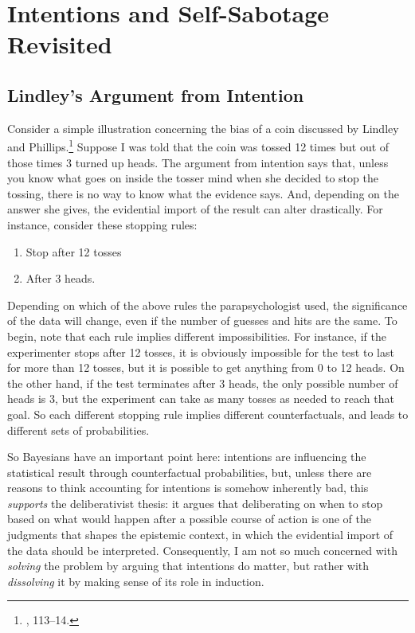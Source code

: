 \hypertarget{intentions-and-self-sabotage-redux}{%
\section{Intentions and Self-Sabotage
Revisited}\label{sec:intentions-and-self-sabotage-redux}}
\subsection{Lindley's Argument from Intention}
Consider a simple illustration concerning the bias of a coin discussed
by Lindley and Phillips.\footnote{\cite{lindleybern}, 113--14.} Suppose I was told
that the coin was tossed 12 times but out of those times 3 turned up
heads. The argument from intention says that, unless you know what goes
on inside the tosser mind when she decided to stop the tossing, there is
no way to know what the evidence says. And, depending on the answer she
gives, the evidential import of the result can alter drastically. For
instance, consider these stopping rules:

\begin{enumerate}
\def\labelenumi{\arabic{enumi}.}
\tightlist
\item
  Stop after 12 tosses
\item
  After 3 heads.
\end{enumerate}

Depending on which of the above rules the
parapsychologist used, the significance of the data will change, even if
the number of guesses and hits are the same. To begin, note that each
rule implies different impossibilities. For instance, if the
experimenter stops after 12 tosses, it is obviously impossible for the
test to last for more than 12 tosses, but it is possible to get anything from 0 to 12 heads. On the other hand, if
the test terminates after 3 heads, the only possible number of heads is
3, but the experiment can take as many tosses as needed to reach that
goal. So each different stopping rule implies different counterfactuals,
and leads to different sets of probabilities.

So Bayesians have an important point here: intentions are influencing
the statistical result through counterfactual probabilities, but, unless
there are reasons to think accounting for intentions is somehow
inherently bad, this \emph{supports} the deliberativist thesis: it argues that deliberating on when to stop based on what would happen after a possible course of action is one of the judgments that shapes the epistemic context, in which the evidential import of the data should be interpreted. Consequently, I am not so much concerned with \emph{solving} the problem by arguing that intentions do matter, but rather with \emph{dissolving} it by making sense of its role in induction. 

